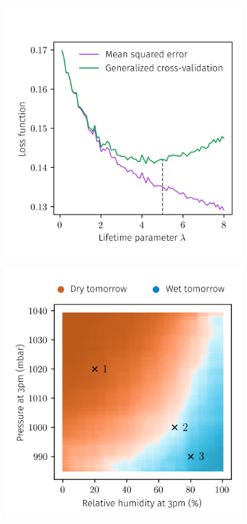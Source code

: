 \begin{figure}
  \centering
  \begin{subfigure}{0.54\textwidth}
    \centering
    \includegraphics[scale=0.6]{graphics/weather_gcv.png}%
  \end{subfigure}
  \begin{subfigure}{0.45\textwidth}
    \centering
    \includegraphics[scale=0.6]{graphics/weather_forest_design.png}%
  \end{subfigure}
\end{figure}

